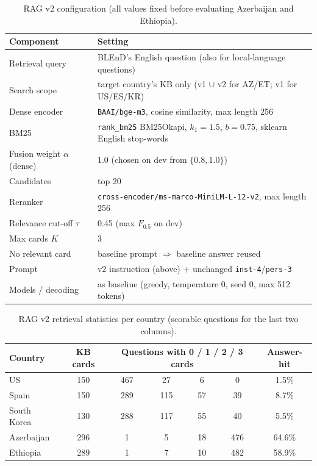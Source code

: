 \documentclass[11pt]{article}
\begin{document}
\begin{table}[h]
\centering
\caption{RAG v2 configuration (all values fixed before evaluating Azerbaijan and Ethiopia).}
\label{tab:hparams}
\begin{tabular}{ll}
\toprule
Component & Setting \\
\midrule
Retrieval query & BLEnD's English question (also for local-language questions) \\
Search scope & target country's KB only (v1 $\cup$ v2 for AZ/ET; v1 for US/ES/KR) \\
Dense encoder & \texttt{BAAI/bge-m3}, cosine similarity, max length 256 \\
BM25 & \texttt{rank\_bm25} BM25Okapi, $k_1{=}1.5$, $b{=}0.75$, sklearn English stop-words \\
Fusion weight $\alpha$ (dense) & 1.0 (chosen on dev from $\{0.8, 1.0\}$) \\
Candidates & top 20 \\
Reranker & \texttt{cross-encoder/ms-marco-MiniLM-L-12-v2}, max length 256 \\
Relevance cut-off $\tau$ & 0.45 (max $F_{0.5}$ on dev) \\
Max cards $K$ & 3 \\
No relevant card & baseline prompt $\Rightarrow$ baseline answer reused \\
Prompt & v2 instruction (above) + unchanged \texttt{inst-4}/\texttt{pers-3} \\
Models / decoding & as baseline (greedy, temperature 0, seed 0, max 512 tokens) \\
\bottomrule
\end{tabular}
\end{table}

\begin{table}[h]
\centering
\caption{RAG v2 retrieval statistics per country (scorable questions for the last two columns).}
\label{tab:v2ret}
\begin{tabular}{lcccccc}
\toprule
Country & KB cards & \multicolumn{4}{c}{Questions with 0 / 1 / 2 / 3 cards} & Answer-hit \\
\midrule
US          & 150 & 467 & 27  & 6  & 0   &  1.5\% \\
Spain       & 150 & 289 & 115 & 57 & 39  &  8.7\% \\
South Korea & 130 & 288 & 117 & 55 & 40  &  5.5\% \\
Azerbaijan  & 296 & 1   & 5   & 18 & 476 & 64.6\% \\
Ethiopia    & 289 & 1   & 7   & 10 & 482 & 58.9\% \\
\bottomrule
\end{tabular}
\end{table}
\end{document}
